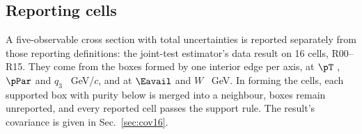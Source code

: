 \subsection{Reporting cells}

A five-observable cross section with total uncertainties is reported separately from those reporting definitions:
the joint-test estimator's data result on 16 cells, R00--R15.
They come from the  boxes formed by one interior edge per axis, at $\pT$ ,
$\pPar$  and $q_3$ ~GeV/$c$, and at $\Eavail$  and
$W$ ~GeV.
In forming the cells, each supported box with purity below  is merged into a neighbour,
 boxes remain unreported, and every reported cell passes the support rule.
The result's covariance is given in Sec.~\ref{sec:cov16}.
